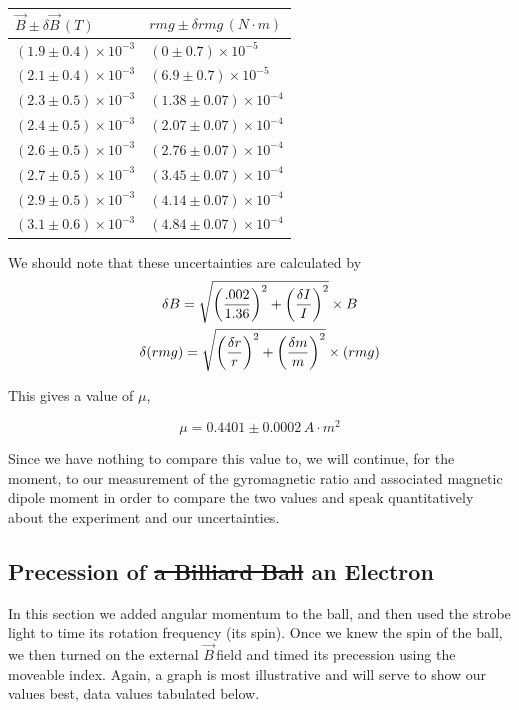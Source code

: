 \documentclass{article}
\newcommand{\B}{$\vec{B}\,$}
\DeclarePairedDelimiter{\parens}{\lparen}{\rparen}
\begin{document}
	\begin{center}
	\begin{tabular}{|l|l|}
		\hline
		$\vec{B} \pm \delta\vec{B} \, (T)$ & $rmg \pm \delta rmg \, (N \cdot m)$ \\
		\hline
		$(1.9 \pm 0.4) \times 10^{-3}$ & $(0 \pm 0.7) \times 10^{-5}$ \\
		$(2.1 \pm 0.4) \times 10^{-3}$ & $(6.9 \pm 0.7) \times 10^{-5}$ \\
		$(2.3 \pm 0.5) \times 10^{-3}$ & $(1.38 \pm 0.07) \times 10^{-4}$ \\
		$(2.4 \pm 0.5) \times 10^{-3}$ & $(2.07 \pm 0.07) \times 10^{-4}$ \\
		$(2.6 \pm 0.5) \times 10^{-3}$ & $(2.76 \pm 0.07) \times 10^{-4}$ \\
		$(2.7 \pm 0.5) \times 10^{-3}$ & $(3.45 \pm 0.07) \times 10^{-4}$ \\
		$(2.9 \pm 0.5) \times 10^{-3}$ & $(4.14 \pm 0.07) \times 10^{-4}$ \\
		$(3.1 \pm 0.6) \times 10^{-3}$ & $(4.84 \pm 0.07) \times 10^{-4}$ \\
		\hline
	\end{tabular}
	\end{center}

	We should note that these uncertainties are calculated by
	\begin{gather*}
		\delta B = \sqrt{ \parens*{\frac{.002}{1.36}}^2 + \parens*{\frac{\delta I}{I}}^2 } \times B\\
		\delta (rmg) = \sqrt{ \parens*{\frac{\delta r}{r}}^2 + \parens*{\frac{\delta m}{m}}^2 } \times (rmg)
	\end{gather*}

	\vspace{.25cm}

	This gives a value of $\mu$,

	$$\boxed{\mu = 0.4401 \pm 0.0002 \, A \cdot m^2}$$

	Since we have nothing to compare this value to, we will continue, for the moment, to our measurement of the gyromagnetic ratio and associated magnetic dipole moment in order to compare the two values and speak quantitatively about the experiment and our uncertainties.

	\subsection{Precession of \sout{a Billiard Ball} an Electron}
	In this section we added angular momentum to the ball, and then used the strobe light to time its rotation frequency (its spin).  Once we knew the spin of the ball, we then turned on the external \B field and timed its precession using the moveable index.  Again, a graph is most illustrative and will serve to show our values best, data values tabulated below.
\end{document}
